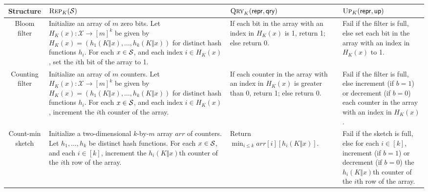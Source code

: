 {\begin{table}[thp]
\begin{center}
  \begin{tabular}{ | c | p{4cm} | p{4cm} | p{4cm} | }
    \hline
    Structure & $\textsc{Rep}_K(\mathcal{S})$ & $\textsc{Qry}_K(\mathsf{repr},\mathsf{qry})$ & $\textsc{Up}_K(\mathsf{repr},\mathsf{up})$ \\ \hline
    Bloom filter & Initialize an array of $m$ zero bits. Let $H_K(x): \mathcal{X} \to [m]^k$ be given by $H_K(x) = (h_1(K \Vert x),\ldots,h_k(K \Vert x))$ for distinct hash functions $h_i$. For each $x \in \mathcal{S}$, and each index $i \in H_K(x)$, set the $i$th bit of the array to 1. & If each bit in the array with an index in $H_K(x)$ is 1, return 1; else return 0. & Fail if the filter is full, else set each bit in the array with an index in $H_K(x)$ to 1. \\ \hline
    Counting filter & Initialize an array of $m$ counters. Let $H_K(x): \mathcal{X} \to [m]^k$ be given by $H_K(x) = (h_1(K \Vert x),\ldots,h_k(K \Vert x))$ for distinct hash functions $h_i$. For each $x \in \mathcal{S}$, and each index $i \in H_K(x)$, increment the $i$th counter of the array. & If each counter in the array with an index in $H_K(x)$ is greater than 0, return 1; else return 0. & Fail if the filter is full, else increment (if $b = 1$) or decrement (if $b = 0$) each counter in the array with an index in $H_K(x)$. \\ \hline
    Count-min sketch & Initialize a two-dimensional $k$-by-$m$ array $arr$ of counters. Let $h_1,\ldots,h_k$ be distinct hash functions. For each $x \in \mathcal{S}$, and each $i \in [k]$, increment the $h_i(K \Vert x)$th counter of the $i$th row of the array. & Return $\min_{i \leq k} arr[i][h_i(K \Vert x)]$. & Fail if the sketch is full, else for each $i \in [k]$, increment (if $b = 1$) or decrement (if $b = 0$) the $h_i(K \Vert x)$th counter of the $i$th row of the array. \\ \hline
  \end{tabular}
\end{center}
\end{table}
}

